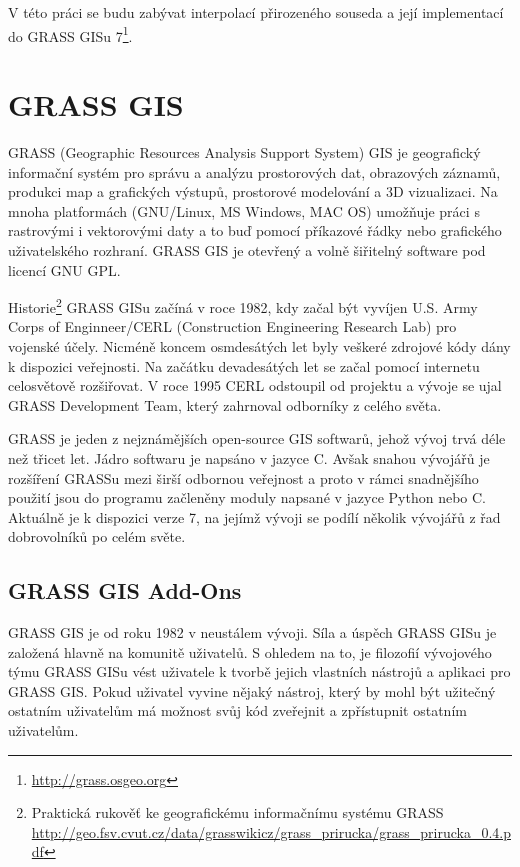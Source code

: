 \documentclass[12pt,a4paper]{article}
\begin{document}
V této práci se budu zabývat interpolací přirozeného souseda a její implementací do GRASS GISu 7\footnote{\url{http://grass.osgeo.org}}. 


\newpage
\section{GRASS GIS}
GRASS (Geographic Resources Analysis Support System) GIS je geografický informační systém pro správu a analýzu prostorových dat, obrazových záznamů, produkci map a grafických výstupů, prostorové modelování a 3D vizualizaci. Na mnoha platformách (GNU/Linux, MS Windows, MAC OS) umožňuje práci s rastrovými i vektorovými daty a to buď pomocí příkazové řádky nebo grafického uživatelského rozhraní. GRASS GIS je otevřený a volně šiřitelný software pod licencí GNU GPL.

Historie\footnote{Praktická rukověť ke geografickému informačnímu systému GRASS \url{http://geo.fsv.cvut.cz/data/grasswikicz/grass_prirucka/grass_prirucka_0.4.pdf}} GRASS GISu začíná v roce 1982, kdy začal být vyvíjen U.S. Army Corps of Enginneer/CERL (Construction Engineering Research Lab) pro vojenské účely. Nicméně koncem osmdesátých let byly veškeré zdrojové kódy dány k dispozici veřejnosti. Na začátku devadesátých let se začal pomocí internetu celosvětově rozšiřovat. V roce 1995 CERL odstoupil od projektu a vývoje se ujal GRASS Development Team, který zahrnoval odborníky z celého světa.

GRASS je jeden z nejznámějších open-source GIS softwarů, jehož vývoj trvá déle než třicet let. Jádro softwaru je napsáno v jazyce C. Avšak snahou vývojářů je rozšíření GRASSu mezi širší odbornou veřejnost a proto v rámci snadnějšího použití jsou do programu začleněny moduly napsané v jazyce Python nebo C. Aktuálně je k dispozici verze 7, na jejímž vývoji se podílí několik vývojářů z řad dobrovolníků po celém světe.

\subsection{GRASS GIS Add-Ons}
GRASS GIS je od roku 1982 v neustálem vývoji. Síla a úspěch GRASS GISu je založená hlavně na komunitě uživatelů. S ohledem na to, je filozofií vývojového týmu GRASS GISu vést uživatele k tvorbě jejich vlastních nástrojů a aplikaci pro GRASS GIS. Pokud uživatel vyvine nějaký nástroj, který by mohl být užitečný ostatním uživatelům má možnost svůj kód zveřejnit a zpřístupnit ostatním uživatelům.
\end{document}
